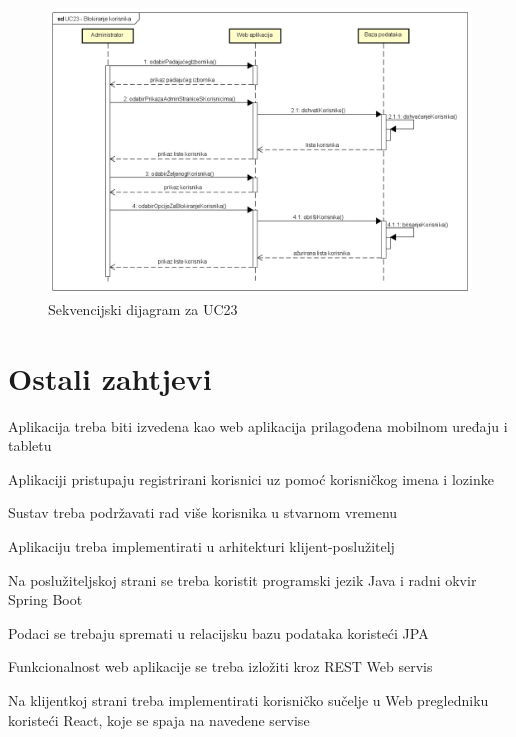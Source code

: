 				\begin{figure}[htb]
					\centering
					\includegraphics[width=14cm]{slike/Sekvencijski dijagram - UC23}
					\caption{Sekvencijski dijagram za UC23}
					\label{fig:Sekvencijski-UC23}
				\end{figure}
				\eject	
	
		\section{Ostali zahtjevi}
		
			\begin{packed_item}
				
				\item Aplikacija treba biti izvedena kao web aplikacija prilagođena mobilnom uređaju i tabletu
				\item Aplikaciji pristupaju registrirani korisnici uz pomoć korisničkog imena i lozinke
				\item Sustav treba podržavati rad više korisnika u stvarnom vremenu
				\item Aplikaciju treba implementirati u arhitekturi klijent-poslužitelj
				\item Na poslužiteljskoj strani se treba koristit programski jezik Java i radni okvir Spring Boot
				\item Podaci se trebaju spremati u relacijsku bazu podataka koristeći JPA
				\item Funkcionalnost web aplikacije se treba izložiti kroz REST Web servis
				\item Na klijentkoj strani treba implementirati korisničko sučelje u Web pregledniku koristeći React, koje se spaja na navedene servise
			\end{packed_item}
			 
			 
			 
	